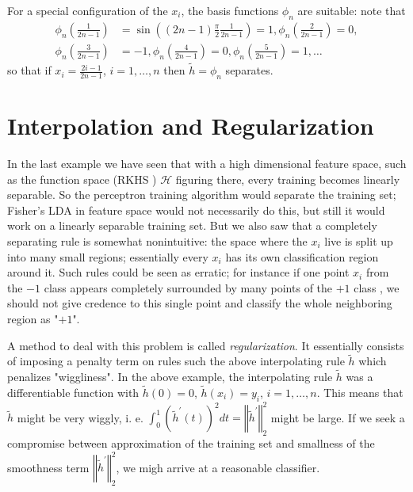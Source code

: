 \documentclass[11pt,twoside]{article}%
\theoremstyle{change}
\begin{document}
For a special configuration of the $x_{i}$, the basis functions $\phi_{n}$ are
suitable: note that
\begin{align*}
\phi_{n}\left(  \frac{1}{2n-1}\right)   & =\sin\left(  (2n-1)\frac{\pi}%
{2}\frac{1}{2n-1}\right)  =1,\phi_{n}\left(  \frac{2}{2n-1}\right)  =0,\\
\phi_{n}\left(  \frac{3}{2n-1}\right)   & =-1,\phi_{n}\left(  \frac{4}%
{2n-1}\right)  =0,\phi_{n}\left(  \frac{5}{2n-1}\right)  =1,\ldots
\end{align*}
so that if $x_{i}=\frac{2i-1}{2n-1}$, $i=1,\ldots,n$ then $\tilde{h}=\phi_{n}$ separates.

\section{Interpolation and Regularization}

In the last example we have seen that with a high dimensional feature space,
such as the function space (RKHS ) $\mathcal{H}$ figuring there, every
training becomes linearly separable. So the perceptron training algorithm
would separate the training set; Fisher's LDA in feature space would not
necessarily do this, but still it would work on a linearly separable training
set. But we also saw that a completely separating rule is somewhat
nonintuitive: the space where the $x_{i}$ live is split up into many small
regions; essentially every $x_{i}$ has its own classification region around
it. Such rules could be seen as erratic; for instance if one point $x_{i}$
from the $-1$ class appears completely surrounded by many points of the $+1 $
class , we should not give credence to this single point and classify the
whole neighboring region as "$+1$".

A method to deal with this problem is called \textit{regularization}. It
essentially consists of imposing a penalty term on rules such the above
interpolating rule $\tilde{h}$ which penalizes "wiggliness". In the above
example, the interpolating rule $\tilde{h}$ was a differentiable function with
$\tilde{h}(0)=0$, $\tilde{h}(x_{i})=y_{i}$, $i=1,\ldots,n$. This means that
$\tilde{h}$ might be very wiggly, i. e. $\int_{0}^{1}\left(  \tilde{h}%
^{\prime}(t)\right)  ^{2}dt=\left\Vert \tilde{h}^{\prime}\right\Vert _{2}^{2}$
might be large. If we seek a compromise between approximation of the training
set and smallness of the smoothness term $\left\Vert \tilde{h}^{\prime
}\right\Vert _{2}^{2}$, we migh arrive at a reasonable classifier.
\end{document}
